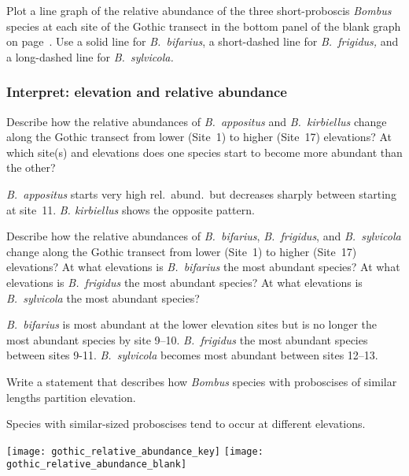 \documentclass[12pt, hidelinks, twoside]{exam}
\newcommand*\AnswerBox[2]{%
    \parbox[t][#1]{0.92\textwidth}{%
    \begin{solution}#2\end{solution}}
    \vspace{\stretch{1}}
}
\begin{document}
\begin{questions}
\question
Plot a line graph of the relative abundance of the three 
short-proboscis \textit{Bombus} species at each site of the Gothic 
transect in the bottom panel of the blank graph on 
page~\pageref{fig:relative_abundance}. Use a solid line for 
\textit{B.~bifarius}, a short-dashed line for \textit{B.~frigidus,} 
and a long-dashed line for \textit{B.~sylvicola.}

\subsubsection*{Interpret: elevation and relative abundance}
\question
Describe how the relative abundances of \textit{B.~appositus} and 
\textit{B.~kirbiellus} change along the Gothic transect from
lower (Site~1) to higher (Site~17) elevations? At which site(s)
and elevations does one species start to become more abundant
than the other?

\AnswerBox{0.05\textheight}{\textit{B.~appositus} starts very 
high rel.~abund.~but decreases sharply between starting at
site~11. \textit{B. kirbiellus} shows the opposite pattern.}

\question
Describe how the relative abundances of \textit{B.~bifarius},
\textit{B.~frigidus}, and \textit{B.~sylvicola} change along 
the Gothic transect from lower (Site~1) to higher (Site~17) elevations? At what elevations is \textit{B.~bifarius} the
most abundant species? At what elevations is \textit{B.~frigidus} 
the most abundant species? At what elevations is \textit{B.~sylvicola} 
the most abundant species?

\AnswerBox{0.05\textheight}{\textit{B.~bifarius} is most abundant
at the lower elevation sites but is no longer the most abundant 
species by site 9–10. \textit{B.~frigidus} the most abundant species
between sites 9-11. \textit{B.~sylvicola} becomes most abundant 
between sites 12–13.}

\question
Write a statement that describes how \textit{Bombus} species with
proboscises of similar lengths partition elevation.

\AnswerBox{0.02\textheight}{Species with similar-sized proboscises
tend to occur at different elevations.}

\newpage

\label{fig:relative_abundance}
\ifprintanswers
	\texttt{[image: gothic\_relative\_abundance\_key]}
\else
	\texttt{[image: gothic\_relative\_abundance\_blank]}
\fi




\end{questions}
\end{document}
